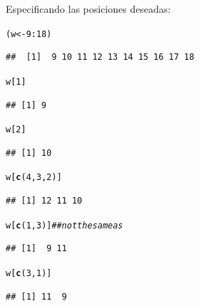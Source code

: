 \documentclass{config/apuntes}\usepackage[]{graphicx}\usepackage[]{xcolor}
\makeatletter
\newcommand{\hlnum}[1]{\textcolor[rgb]{0.686,0.059,0.569}{#1}}%
\newcommand{\hlcom}[1]{\textcolor[rgb]{0.678,0.584,0.686}{\textit{#1}}}%
\newcommand{\hlopt}[1]{\textcolor[rgb]{0,0,0}{#1}}%
\newcommand{\hldef}[1]{\textcolor[rgb]{0.345,0.345,0.345}{#1}}%
\newcommand{\hlkwb}[1]{\textcolor[rgb]{0.69,0.353,0.396}{#1}}%
\newcommand{\hlkwd}[1]{\textcolor[rgb]{0.737,0.353,0.396}{\textbf{#1}}}%
\newenvironment{kframe}{%
 \def\at@end@of@kframe{}%
 \ifinner\ifhmode%
  \def\at@end@of@kframe{\end{minipage}}%
  \begin{minipage}{\columnwidth}%
 \fi\fi%
 \def\FrameCommand##1{\hskip\@totalleftmargin \hskip-\fboxsep
 \colorbox{shadecolor}{##1}\hskip-\fboxsep
     \hskip-\linewidth \hskip-\@totalleftmargin \hskip\columnwidth}%
 \MakeFramed {\advance\hsize-\width
   \@totalleftmargin\z@ \linewidth\hsize
   \@setminipage}}%
 {\par\unskip\endMakeFramed%
 \at@end@of@kframe}
\newenvironment{knitrout}{}{} %
\makeatother
\begin{document}
Especificando las posiciones deseadas:
\begin{knitrout}
\color{fgcolor}\begin{kframe}
\begin{alltt}
\hldef{(w} \hlkwb{<-} \hlnum{9}\hlopt{:}\hlnum{18}\hldef{)}
\end{alltt}
\begin{verbatim}
##  [1]  9 10 11 12 13 14 15 16 17 18
\end{verbatim}
\begin{alltt}
\hldef{w[}\hlnum{1}\hldef{]}
\end{alltt}
\begin{verbatim}
## [1] 9
\end{verbatim}
\begin{alltt}
\hldef{w[}\hlnum{2}\hldef{]}
\end{alltt}
\begin{verbatim}
## [1] 10
\end{verbatim}
\begin{alltt}
\hldef{w[}\hlkwd{c}\hldef{(}\hlnum{4}\hldef{,} \hlnum{3}\hldef{,} \hlnum{2}\hldef{)]}
\end{alltt}
\begin{verbatim}
## [1] 12 11 10
\end{verbatim}
\end{kframe}
\end{knitrout}

\begin{knitrout}
\color{fgcolor}\begin{kframe}
\begin{alltt}
\hldef{w[}\hlkwd{c}\hldef{(}\hlnum{1}\hldef{,} \hlnum{3}\hldef{)]} \hlcom{## not the same as}
\end{alltt}
\begin{verbatim}
## [1]  9 11
\end{verbatim}
\begin{alltt}
\hldef{w[}\hlkwd{c}\hldef{(}\hlnum{3}\hldef{,} \hlnum{1}\hldef{)]}
\end{alltt}
\begin{verbatim}
## [1] 11  9
\end{verbatim}
\end{kframe}
\end{knitrout}
\end{document}
